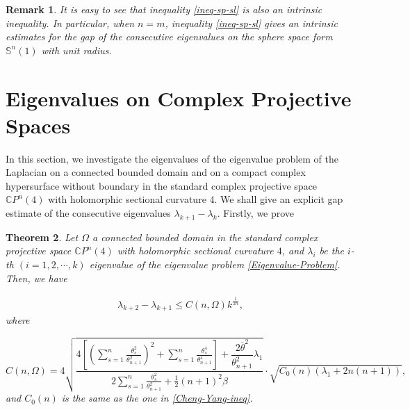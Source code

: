 \documentclass[12pt]{article}
\newtheorem{thm}{Theorem}[section]
\newtheorem{rem}[thm]{Remark}
\numberwithin{equation}{section}
\begin{document}
\begin{rem} It is easy to see that inequality \eqref{ineq-sp-sl} is also  an intrinsic inequality.
In particular, when $n=m$, inequality \eqref{ineq-sp-sl} gives an intrinsic estimates for the gap of the consecutive eigenvalues on the
sphere space form $\mathbb{S}^{n}(1)$ with unit radius.\end{rem}



\section{Eigenvalues on Complex Projective Spaces}\label{sec5}

In this section, we investigate the eigenvalues of the eigenvalue problem of the Laplacian
on a connected bounded domain  and on a compact complex hypersurface without boundary in the standard
complex projective space $\mathbb{C}P^{n}(4)$ with holomorphic sectional curvature $4$. We shall give an explicit
gap estimate of the consecutive eigenvalues $\lambda_{k+1}-\lambda_{k}$. Firstly, we prove

\begin{thm}\label{thm5.1}Let $\Omega$ a connected bounded domain
in the standard complex projective space $\mathbb{C}P^{n}(4)$ with holomorphic sectional curvature $4$,
and $\lambda_{i}$ be the $i$-th $(i=1,2,\cdots,k)$
eigenvalue of the eigenvalue problem \eqref{Eigenvalue-Problem}. Then, we have

\begin{equation*}\begin{aligned}\lambda_{k+2}-\lambda_{k+1}\leq C(n,\Omega)k^{\frac{1}{2n}},
\end{aligned}\end{equation*} where

\begin{equation*}C(n,\Omega)=4\sqrt{\frac{ 4\left[\left(\sum^{n}_{s=1}\frac{\theta_{s}^{2}}{\theta_{n+1}^{2}} \right)^{2}
+\sum^{n}_{s=1}\frac{\theta_{s}^{4}}{\theta_{n+1}^{4}}\right]+\dfrac{2\overline{\theta}^{2}}{\theta^{2}_{n+1}}\lambda_{1}}
{2\sum^{n}_{s=1}\frac{\theta_{s}^{2}}{\theta_{n+1}^{2}}+\frac{1}{2}(n+1)^{2}\beta}}\cdot\sqrt{C_{0}(n)(\lambda_{1}+2n(n+1))},\end{equation*}
 and $C_{0}(n)$ is the same as the one in \eqref{Cheng-Yang-ineq}. \end{thm}
\end{document}
